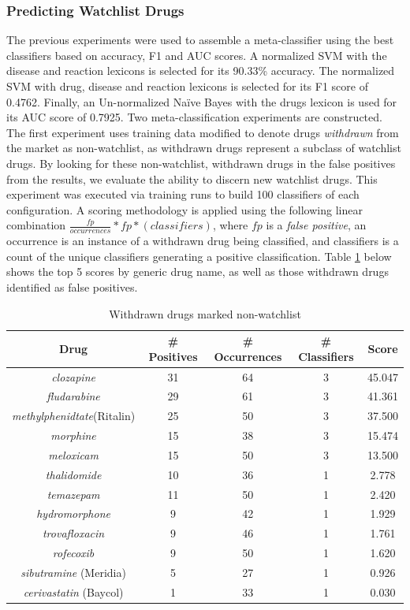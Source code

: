 \documentclass[twoside,11pt]{article}
\begin{document}
\subsubsection{Predicting Watchlist Drugs}
The previous experiments were used to assemble a meta-classifier using the best classifiers based on accuracy, F1 and AUC scores. A normalized SVM with the disease and reaction lexicons is selected for its 90.33\% accuracy. The normalized SVM with drug, disease and reaction lexicons is selected for its F1 score of 0.4762. Finally, an Un-normalized Na\"ive Bayes with the drugs lexicon is used for its AUC score of 0.7925.
Two meta-classification experiments are constructed. The first experiment uses training data modified to denote drugs \textit{withdrawn} from the market as non-watchlist, as withdrawn drugs represent a subclass of watchlist drugs. By looking for these non-watchlist, withdrawn drugs in the false positives from the results, we evaluate the ability to discern new watchlist drugs. This experiment was executed via training runs to build 100 classifiers of each configuration. A scoring methodology is applied using the following linear combination $\frac{fp}{occurrences} * fp * (classifiers)$, where $fp$ is a \textit{false positive}, an occurrence is an instance of a withdrawn drug being classified, and classifiers is a count of the unique classifiers generating a positive classification. Table \ref{table7} below shows the top 5 scores by generic drug name, as well as those withdrawn drugs identified as false positives.
\begin{table}[H]
  \centering
  \caption{Withdrawn drugs marked non-watchlist}
  \label{table7}
  \begin{tabular}{||c|c|c|c|c||}
    \hline
    Drug & # Positives & # Occurrences & # Classifiers & Score \\
    \hline\hline
    \textit{clozapine} & 31 & 64 & 3 & 45.047 \\
    \hline
    \textit{fludarabine} & 29 & 61 & 3 & 41.361 \\
    \hline
    \textit{methylphenidtate}(Ritalin) & 25 & 50 & 3 & 37.500 \\
    \hline
    \textit{morphine} & 15 & 38 & 3 & 15.474 \\
    \hline
    \textit{meloxicam} & 15 & 50 & 3 & 13.500 \\
    \hline\hline
    \textit{thalidomide} & 10 & 36 & 1 & 2.778 \\
    \textit{temazepam} & 11 & 50 & 1 & 2.420 \\
    \textit{hydromorphone} & 9 & 42 & 1 & 1.929 \\
    \textit{trovafloxacin} & 9 & 46 & 1 & 1.761 \\
    \textit{rofecoxib} & 9 & 50 & 1 & 1.620 \\
    \textit{sibutramine} (Meridia) & 5 & 27 & 1 & 0.926 \\
    \textit{cerivastatin} (Baycol) & 1 & 33 & 1 & 0.030 \\
    \hline
  \end{tabular}
\end{table}
\end{document}
